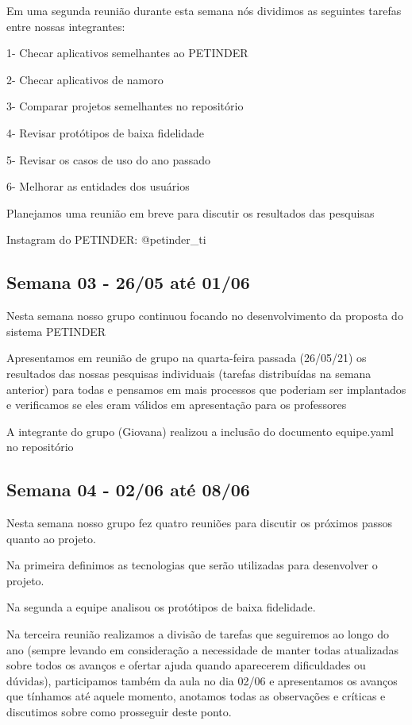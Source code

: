 \begin{apendicesenv}
\begin{flushleft}
Em uma segunda reunião durante esta semana nós dividimos as seguintes tarefas entre nossas integrantes:

1- Checar aplicativos semelhantes ao PETINDER 

2- Checar aplicativos de namoro

3- Comparar projetos semelhantes no repositório 

4- Revisar protótipos de baixa fidelidade 

5- Revisar os casos de uso do ano passado

6- Melhorar as entidades dos usuários

Planejamos uma reunião em breve para discutir os resultados das pesquisas

\gls{Instagram} do PETINDER: @petinder\_ti

\end{flushleft}
\begin{flushleft}
 \section{Semana 03 - 26/05 até 01/06}
  Nesta semana nosso grupo continuou focando no desenvolvimento da proposta do sistema PETINDER

Apresentamos em reunião de grupo na quarta-feira passada (26/05/21) os resultados das nossas pesquisas individuais (tarefas distribuídas na semana anterior) para todas e pensamos em mais processos que poderiam ser implantados e verificamos se eles eram válidos em apresentação para os professores 

A integrante do grupo (Giovana) realizou a inclusão do documento equipe.yaml no repositório
\end{flushleft}
\begin{flushleft}
 \section{Semana 04 - 02/06 até 08/06}
 Nesta semana nosso grupo fez quatro reuniões para discutir os próximos passos quanto ao projeto.

Na primeira definimos as tecnologias que serão utilizadas para desenvolver o projeto.

Na segunda a equipe analisou os protótipos de baixa fidelidade.

Na terceira reunião realizamos a divisão de tarefas que seguiremos ao longo do ano (sempre levando em consideração a necessidade de manter todas atualizadas sobre todos os avanços e ofertar ajuda quando aparecerem dificuldades ou dúvidas), participamos também da aula no dia 02/06 e apresentamos os avanços que tínhamos até aquele momento, anotamos todas as observações e críticas e discutimos sobre como prosseguir deste ponto.


\end{flushleft}
\end{apendicesenv}
